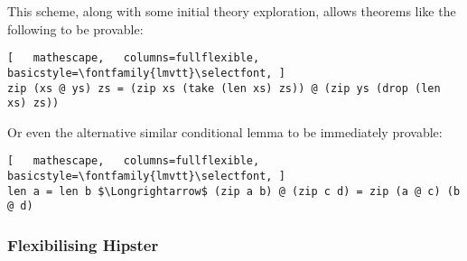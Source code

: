 \noindent This scheme, along with some initial theory exploration, allows theorems like the following to be provable:

\begin{lstlisting}[   mathescape,   columns=fullflexible,   basicstyle=\fontfamily{lmvtt}\selectfont, ]
zip (xs @ ys) zs = (zip xs (take (len xs) zs)) @ (zip ys (drop (len xs) zs))
\end{lstlisting}

\noindent Or even the alternative similar conditional lemma to be immediately provable:

\begin{lstlisting}[   mathescape,   columns=fullflexible,   basicstyle=\fontfamily{lmvtt}\selectfont, ]
len a = len b $\Longrightarrow$ (zip a b) @ (zip c d) = zip (a @ c) (b @ d)
\end{lstlisting}


\subsubsection*{Flexibilising Hipster}





